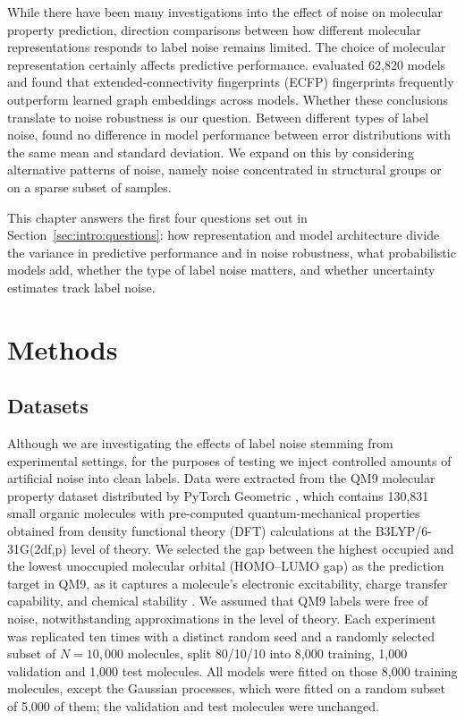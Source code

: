 While there have been many investigations into the effect of noise on molecular property prediction, direction comparisons between how different molecular representations responds to label noise remains limited. The choice of molecular representation certainly affects predictive performance. \cite{Deng2023} evaluated 62,820 models and found that extended-connectivity fingerprints (ECFP) fingerprints frequently outperform learned graph embeddings across models. Whether these conclusions translate to noise robustness is our question. Between different types of label noise, \cite{Heid2023} found no difference in model performance between error distributions with the same mean and standard deviation. We expand on this by considering alternative patterns of noise, namely noise concentrated in structural groups or on a sparse subset of samples.

This chapter answers the first four questions set out in Section~\ref{sec:intro:questions}: how representation and model architecture divide the variance in predictive performance and in noise robustness, what probabilistic models add, whether the type of label noise matters, and whether uncertainty estimates track label noise.

\section{Methods}\label{sec:robustness:methods}


\subsection{Datasets}

Although we are investigating the effects of label noise stemming from experimental settings, for the purposes of testing we inject controlled amounts of artificial noise into clean labels. Data were extracted from the QM9 molecular property dataset distributed by PyTorch Geometric \citep{Ramakrishnan2014}, which contains 130,831 small organic molecules with pre-computed quantum-mechanical properties obtained from density functional theory (DFT) calculations at the B3LYP/6-31G(2df,p) level of theory. We selected the gap between the highest occupied and the lowest unoccupied molecular orbital (HOMO--LUMO gap) as the prediction target in QM9, as it captures a molecule's electronic excitability, charge transfer capability, and chemical stability \citep{Fediai2023}. We assumed that QM9 labels were free of noise, notwithstanding approximations in the level of theory. Each experiment was replicated ten times with a distinct random seed and a randomly selected subset of $N = 10{,}000$ molecules, split 80/10/10 into 8,000 training, 1,000 validation and 1,000 test molecules. All models were fitted on those 8,000 training molecules, except the Gaussian processes, which were fitted on a random subset of 5,000 of them; the validation and test molecules were unchanged.

